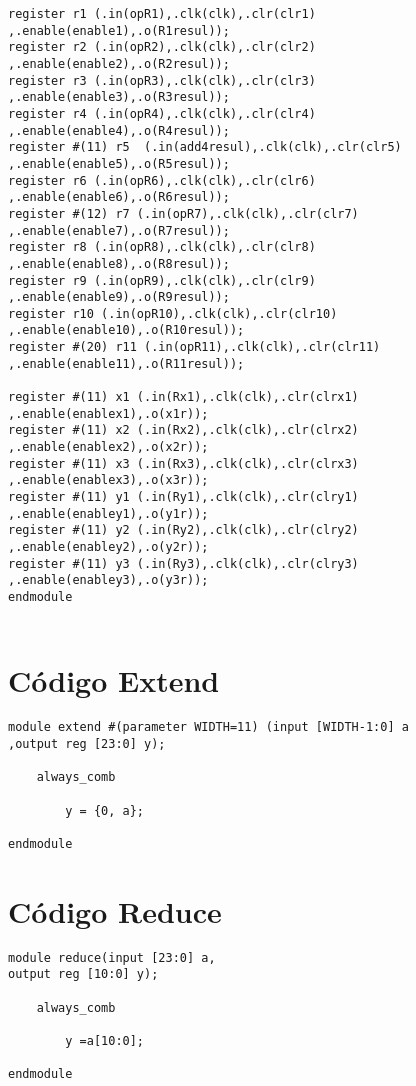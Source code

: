 \begin{lstlisting}[style={verilog-style}]
register r1 (.in(opR1),.clk(clk),.clr(clr1)
,.enable(enable1),.o(R1resul));
register r2 (.in(opR2),.clk(clk),.clr(clr2)
,.enable(enable2),.o(R2resul));
register r3 (.in(opR3),.clk(clk),.clr(clr3)
,.enable(enable3),.o(R3resul));
register r4 (.in(opR4),.clk(clk),.clr(clr4)
,.enable(enable4),.o(R4resul));
register #(11) r5  (.in(add4resul),.clk(clk),.clr(clr5)
,.enable(enable5),.o(R5resul));
register r6 (.in(opR6),.clk(clk),.clr(clr6)
,.enable(enable6),.o(R6resul));
register #(12) r7 (.in(opR7),.clk(clk),.clr(clr7)
,.enable(enable7),.o(R7resul));
register r8 (.in(opR8),.clk(clk),.clr(clr8)
,.enable(enable8),.o(R8resul));
register r9 (.in(opR9),.clk(clk),.clr(clr9)
,.enable(enable9),.o(R9resul));
register r10 (.in(opR10),.clk(clk),.clr(clr10)
,.enable(enable10),.o(R10resul));
register #(20) r11 (.in(opR11),.clk(clk),.clr(clr11)
,.enable(enable11),.o(R11resul));

register #(11) x1 (.in(Rx1),.clk(clk),.clr(clrx1)
,.enable(enablex1),.o(x1r));
register #(11) x2 (.in(Rx2),.clk(clk),.clr(clrx2)
,.enable(enablex2),.o(x2r));
register #(11) x3 (.in(Rx3),.clk(clk),.clr(clrx3)
,.enable(enablex3),.o(x3r));
register #(11) y1 (.in(Ry1),.clk(clk),.clr(clry1)
,.enable(enabley1),.o(y1r));
register #(11) y2 (.in(Ry2),.clk(clk),.clr(clry2)
,.enable(enabley2),.o(y2r));
register #(11) y3 (.in(Ry3),.clk(clk),.clr(clry3)
,.enable(enabley3),.o(y3r));
endmodule


\end{lstlisting}

\section{Código Extend}

\label{codeextend}
\begin{lstlisting}[style={verilog-style}]
module extend #(parameter WIDTH=11) (input [WIDTH-1:0] a
,output reg [23:0] y);

	always_comb

		y = {0, a};   

endmodule
\end{lstlisting}

\section{Código Reduce}
\label{codereduce}
\begin{lstlisting}[style={verilog-style}]
module reduce(input [23:0] a,
output reg [10:0] y);

	always_comb

		y =a[10:0];  

endmodule

\end{lstlisting}

